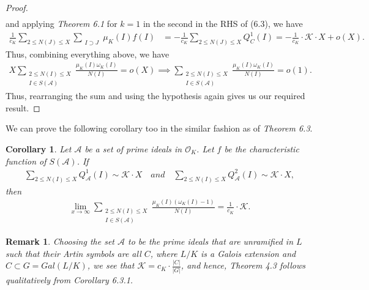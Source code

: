\documentclass[12pt]{article}
\numberwithin{equation}{section}
\newtheorem{corollary}{Corollary}[theorem]
\newtheorem{remark}[theorem]{Remark}
\numberwithin{equation}{section}
\begin{document}
\begin{proof}
\begin{align}
  \end{align}
    and applying \textit{Theorem 6.1} for $k=1$ in the second in the RHS of (6.3), we have
    \begin{align}
        \frac{1}{c_K}   \sum_{2\leq N(J)\leq X}\sum_{\substack{I\supset J}} \mu_K(I)f(I)  &= -\frac{1}{c_K}   \sum_{2\leq N(J)\leq X} Q_C^1(I)  = -\frac{1}{c_K}\cdot \mathcal{K}\cdot X +o(X).
    \end{align}
    Thus, combining everything above, we have
    \begin{align}
         X\sum_{\substack{2\leq N(I) \leq X \\ I \in S(\mathcal{A})}}\frac{\mu_K(I)\omega_K(I)}{N(I)} =o(X) \implies \sum_{\substack{2\leq N(I) \leq X \\ I \in S(\mathcal{A})}}\frac{\mu_K(I)\omega_K(I)}{N(I)} = o(1) .
    \end{align}
   Thus, rearranging the sum and using the hypothesis again gives us our required result.
\end{proof}
\noindent We can prove the following corollary too in the similar fashion as of \textit{Theorem 6.3}.
\begin{corollary}
       Let $\mathcal{A}$ be a set of prime ideals in $\mathcal{O}_K$. Let $f$ be the characteristic function of $S(\mathcal{A})$. If 
    \begin{align}
        \sum_{2\leq N(I)\leq X}Q_{\mathcal{A}}^1(I) \sim \mathcal{K}\cdot X \quad and\quad \sum_{2\leq N(I)\leq X}Q_{\mathcal{A}}^2(I) \sim \mathcal{K}\cdot X ,\nonumber
    \end{align}
    then
    \begin{align}
        \lim_{x\to \infty}\sum_{\substack{2 \leq N(I)\leq X \\ I\in S(\mathcal{A})}} \frac{\mu_K(I)(\omega_K(I)-1)}{N(I)} = \frac{1}{c_K}\cdot \mathcal{K}.\nonumber
    \end{align}
\end{corollary}
 \begin{remark}
     Choosing the set $\mathcal{A}$ to be the prime ideals that are unramified in $L$ such that their Artin symbols are all $C$, where $L/K$ is a Galois extension and $C\subset G=Gal(L/K)$, we see that $\mathcal{K}=c_K\cdot \frac{|C|}{|G|}$, and hence, \textit{Theorem 4.3} follows qualitatively from \textit{Corollary 6.3.1}.
 \end{remark}
\end{document}
